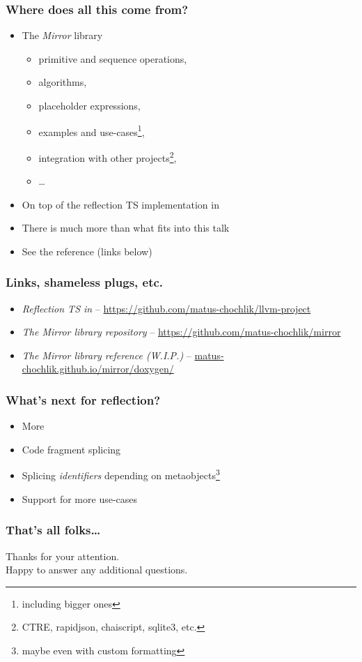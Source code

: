 \documentclass[compress,table,xcolor=table]{beamer}
\begin{document}
\begin{frame}
  \frametitle{Where does all this come from?}
  \larger
  \begin{itemize}
    \item The {\em Mirror} library
    \begin{itemize}
      \item primitive and sequence operations,
      \item algorithms,
      \item placeholder expressions,
      \item examples and use-cases\footnote{including bigger ones},
      \item integration with other projects\footnote{CTRE, rapidjson, chaiscript,
        sqlite3, etc.},
      \item \ldots
    \end{itemize}
    \item On top of the reflection TS implementation in 
    \item There is much more than what fits into this talk
    \item See the reference (links below)
  \end{itemize}
\end{frame}
\begin{frame}
  \frametitle{Links, shameless plugs, etc.}
  \begin{itemize}
    \item {\em Reflection TS in } --
      \url{https://github.com/matus-chochlik/llvm-project}
    \item {\em The Mirror library repository} --
      \url{https://github.com/matus-chochlik/mirror}
    \item {\em The Mirror library reference (W.I.P.)} --
      \url{matus-chochlik.github.io/mirror/doxygen/}
  \end{itemize}
\end{frame}
\begin{frame}
  \frametitle{What's next for reflection?}
  \Large
  \begin{itemize}
    \item More 
    \item Code fragment splicing
    \item Splicing {\em \larger identifiers} depending on metaobjects\footnote{
        maybe even with custom formatting}
    \item Support for more use-cases
  \end{itemize}
\end{frame}
\begin{frame}
  \frametitle{That's all folks\dots}
  \centering
  \Huge
  Thanks for your attention.\\
  \Large
  Happy to answer any additional questions.
\end{frame}
\end{document}
